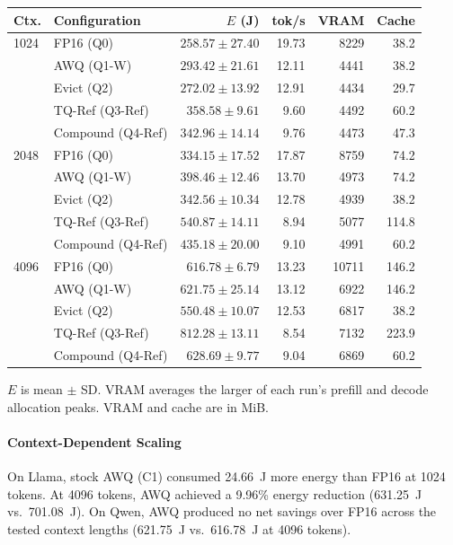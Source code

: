 \documentclass[conference,a4paper]{IEEEtran}
\begin{document}
\begin{table}[t]
\begin{tabular*}{\columnwidth}{@{\extracolsep{\fill}}llrrrr@{}}
\midrule
\textbf{Ctx.} & \textbf{Configuration} & \textbf{$E$ (J)} & \textbf{tok/s} & \textbf{VRAM} & \textbf{Cache} \\
\midrule
1024 & FP16 (Q0)          & $258.57 \pm 27.40$ & 19.73 & 8229 &  38.2 \\
     & AWQ (Q1-W)         & $293.42 \pm 21.61$ & 12.11 & 4441 &  38.2 \\
     & Evict (Q2)         & $272.02 \pm 13.92$ & 12.91 & 4434 &  29.7 \\
     & TQ-Ref (Q3-Ref)    & $358.58 \pm 9.61$  &  9.60 & 4492 &  60.2 \\
     & Compound (Q4-Ref)  & $342.96 \pm 14.14$ &  9.76 & 4473 &  47.3 \\
\midrule
2048 & FP16 (Q0)          & $334.15 \pm 17.52$ & 17.87 & 8759 &  74.2 \\
     & AWQ (Q1-W)         & $398.46 \pm 12.46$ & 13.70 & 4973 &  74.2 \\
     & Evict (Q2)         & $342.56 \pm 10.34$ & 12.78 & 4939 &  38.2 \\
     & TQ-Ref (Q3-Ref)    & $540.87 \pm 14.11$ &  8.94 & 5077 & 114.8 \\
     & Compound (Q4-Ref)  & $435.18 \pm 20.00$ &  9.10 & 4991 &  60.2 \\
\midrule
4096 & FP16 (Q0)          & $616.78 \pm 6.79$  & 13.23 & 10711 & 146.2 \\
     & AWQ (Q1-W)         & $621.75 \pm 25.14$ & 13.12 &  6922 & 146.2 \\
     & Evict (Q2)         & $550.48 \pm 10.07$ & 12.53 &  6817 &  38.2 \\
     & TQ-Ref (Q3-Ref)    & $812.28 \pm 13.11$ &  8.54 &  7132 & 223.9 \\
     & Compound (Q4-Ref)  & $628.69 \pm 9.77$  &  9.04 &  6869 &  60.2 \\
\bottomrule
\end{tabular*}

\vspace{1pt}
\raggedright\footnotesize $E$ is mean $\pm$ SD. VRAM averages the larger of each run's prefill and decode allocation peaks. VRAM and cache are in MiB.\par
\end{table}

\paragraph{Context-Dependent Scaling}
On Llama, stock AWQ (C1) consumed 24.66~J more energy than FP16 at 1024 tokens. At 4096 tokens, AWQ achieved a 9.96\% energy reduction (631.25~J vs.\ 701.08~J). On Qwen, AWQ produced no net savings over FP16 across the tested context lengths (621.75~J vs.\ 616.78~J at 4096 tokens).
\end{document}
